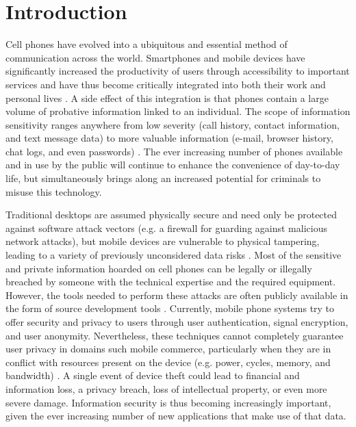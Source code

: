 \documentclass[conference,10pt]{IEEEtran}
\begin{document}




%
\IEEEpeerreviewmaketitle

\section{Introduction}
Cell phones have evolved into a ubiquitous and essential method of communication across the world.  
Smartphones and mobile devices have significantly increased the productivity of users through accessibility 
to important services and have thus become critically integrated into both their work and personal lives 
\cite{mobile}.   A side effect of this integration is that phones contain a large volume of probative 
information linked to an individual.  The scope of information sensitivity ranges anywhere from low 
severity (call history, contact information, and text message data) to more valuable information (e-mail, 
browser history, chat logs, and even passwords) \cite{lost_phone}.  The ever increasing number of phones 
available and in use by the public will continue to enhance the convenience of day-to-day life, but 
simultaneously brings along an increased potential for criminals to misuse this technology.

Traditional desktops are assumed physically secure and need only be protected against software attack 
vectors (e.g. a firewall for guarding against malicious network attacks), but mobile devices are vulnerable 
to physical tampering, leading to a variety of previously unconsidered data risks \cite{mobile}.  Most of 
the sensitive and private information hoarded on cell phones can be legally or illegally breached by 
someone with the technical expertise and the required equipment.  However, the tools needed to perform 
these attacks are often publicly available in the form of source development tools \cite{forensics}.  
Currently, mobile phone systems try to offer security and privacy to users through user authentication, 
signal encryption, and user anonymity. Nevertheless, these techniques cannot completely guarantee user 
privacy in domains such mobile commerce, particularly when they are in conflict with resources present on 
the device (e.g. power, cycles, memory, and bandwidth) \cite{mobile}.  A single event of device theft could 
lead to financial and information loss, a privacy breach, loss of intellectual property, or even more 
severe damage.  Information security is thus becoming increasingly important, given the ever increasing 
number of new applications that make use of that data.
\end{document}
